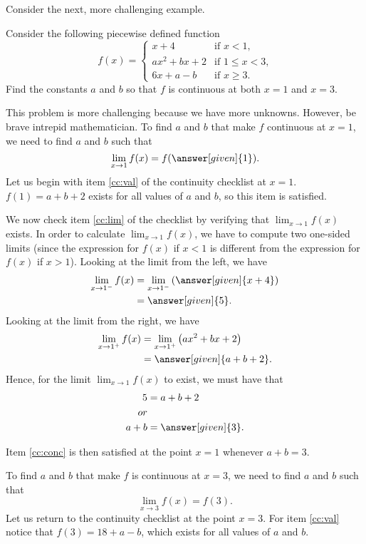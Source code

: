 \documentclass{ximera}
\begin{document}
Consider the next, more challenging example.

\begin{example}
	Consider the following piecewise defined function
	\[
	f(x) = 
	\begin{cases}
	  x+4 &\text{if $x<1$,}\\
	  ax^2+bx+2 &\text{if $1\le x< 3$,}\\
	  6x+a-b &\text{if $x\ge 3$.}
	\end{cases}
	\]
	Find the constants $a$ and $b$ so that $f$ is continuous at both $x=1$ and $x=3$.
	\begin{explanation}
		This problem is more challenging because we have more
		unknowns. However, be brave intrepid mathematician.  To find $a$ and
		$b$ that make $f$ continuous at $x=1$, we need to find $a$ and $b$
		such that
		\[
		\lim_{x\to 1} f(x) =f(\answer[given]{1}).
		\]
		Let us begin with item \ref{cc:val} of the continuity checklist at $x=1$.
		$f(1)=a+b+2$ exists for all values of $a$ and $b$, so this item is satisfied. 

		We now check item \ref{cc:lim} of the checklist by verifying that $\displaystyle \lim_{x\to 1}f(x)$ exists.
		In order to calculate $\lim_{x\to 1}f(x)$, we have to compute two one-sided limits 
		(since the expression for  $f(x)$ if $x<1$ is  different from the expression for $f(x)$ if $x>1$).
		Looking at the limit from the left, we have
		\begin{align*}
			  \lim_{x\to 1^-} f(x) &= \lim_{x\to 1^-} \left(\answer[given]{x+4}\right) \\
				  &=\answer[given]{5}.
		\end{align*}
		Looking at the limit from the right, we have
		\begin{align*}
		  \lim_{x\to 1^+} f(x) &= \lim_{x\to 1^+} \left(ax^2+bx+2\right) \\
			  &= \answer[given]{a+b+2}.
		\end{align*}
		Hence, for the limit $\lim_{x\to 1} f(x)$ to exist, we must have that 
		\begin{align*}
		  5 &= a+b+2\\ or\\
		  a+b &= \answer[given]{3}.
		\end{align*}
		
		Item \ref{cc:conc} is then satisfied at the point $x=1$ whenever $a+b=3$.		

		
		To find $a$ and $b$ that make $f$ is continuous at $x=3$, we need to
		find $a$ and $b$ such that
		\[
		\lim_{x\to 3} f(x) =f(3).
		\]
		Let us return to the continuity checklist at the point $x=3$.
		For item \ref{cc:val} notice that $f(3)=18+a-b$, which exists for all values of $a$ and $b$. 


\end{explanation}
\end{example}
\end{document}
